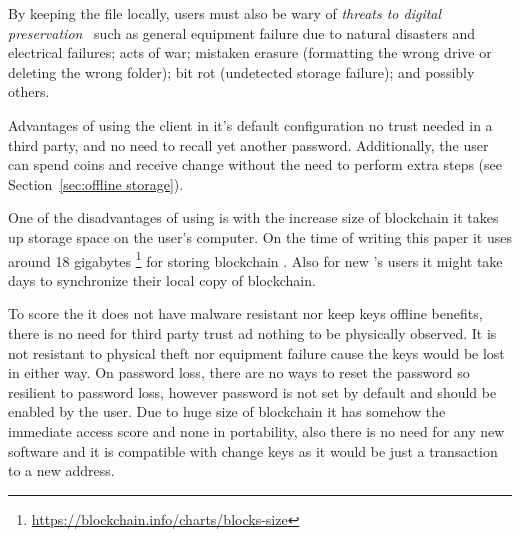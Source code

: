 By keeping the \walletfile file locally, users must also be wary of \textit{threats to digital preservation}~\cite{BKM05} such as general equipment failure due to natural disasters and electrical failures; acts of war; mistaken erasure (\eg formatting the wrong drive or deleting the wrong folder); bit rot (\ie undetected storage failure); and possibly others. 

Advantages of using the \bitcoinclient client in it's default configuration no trust needed in a third party, and no need to recall yet another password. Additionally, the user can spend coins and receive change without the need to perform extra steps (see Section~\ref{sec:offline storage}). 

One of the disadvantages of using \bitcoinclient is with the increase size of blockchain it takes up storage space on the user's computer. On the time of writing this paper it uses around 18 gigabytes \footnote{\url{https://blockchain.info/charts/blocks-size}} for storing blockchain . Also for new \bitcoinclient's users it might take days to synchronize their local copy of blockchain.

To score the \bitcoinclient it does not have malware resistant nor keep keys offline benefits, there is no need for third party trust ad nothing to be physically observed. It is not resistant to physical theft nor equipment failure cause the keys would be lost in either way. On password loss, there are no ways to reset the password so resilient to password loss, however password is not set by default and should be enabled by the user. Due to huge size of blockchain it has somehow the immediate access score and none in portability, also there is no need for any new software and it is compatible with change keys as it would be just a transaction to a new address.

